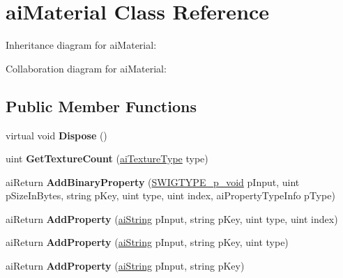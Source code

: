 \hypertarget{classai_material}{\section{ai\+Material Class Reference}
\label{classai_material}
}


Inheritance diagram for ai\+Material\+:


Collaboration diagram for ai\+Material\+:
\subsection*{Public Member Functions}
\begin{DoxyCompactItemize}
\item 
\hypertarget{classai_material_a5559b184666c962eae82aa7e6ec80add}{virtual void {\bfseries Dispose} ()}\label{classai_material_a5559b184666c962eae82aa7e6ec80add}

\item 
\hypertarget{classai_material_a7996ab1901166deccaf0e9157a056040}{uint {\bfseries Get\+Texture\+Count} (\hyperlink{material_8h_a7dd415ff703a2cc53d1c22ddbbd7dde0}{ai\+Texture\+Type} type)}\label{classai_material_a7996ab1901166deccaf0e9157a056040}

\item 
\hypertarget{classai_material_a17fdf0e819f4afdf1121b404114b36d1}{ai\+Return {\bfseries Add\+Binary\+Property} (\hyperlink{class_s_w_i_g_t_y_p_e__p__void}{S\+W\+I\+G\+T\+Y\+P\+E\+\_\+p\+\_\+void} p\+Input, uint p\+Size\+In\+Bytes, string p\+Key, uint type, uint index, ai\+Property\+Type\+Info p\+Type)}\label{classai_material_a17fdf0e819f4afdf1121b404114b36d1}

\item 
\hypertarget{classai_material_a803ceb9d87e88f74ebe4c2cc466fc902}{ai\+Return {\bfseries Add\+Property} (\hyperlink{structai_string}{ai\+String} p\+Input, string p\+Key, uint type, uint index)}\label{classai_material_a803ceb9d87e88f74ebe4c2cc466fc902}

\item 
\hypertarget{classai_material_acef167f63392619ed0f4236fc2d67611}{ai\+Return {\bfseries Add\+Property} (\hyperlink{structai_string}{ai\+String} p\+Input, string p\+Key, uint type)}\label{classai_material_acef167f63392619ed0f4236fc2d67611}

\item 
\hypertarget{classai_material_ab07975754a994f519cb4ae914f894ccc}{ai\+Return {\bfseries Add\+Property} (\hyperlink{structai_string}{ai\+String} p\+Input, string p\+Key)}\label{classai_material_ab07975754a994f519cb4ae914f894ccc}


\end{DoxyCompactItemize}
